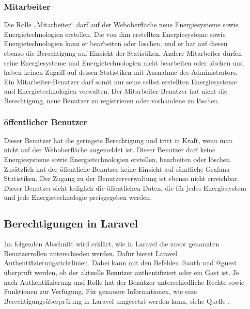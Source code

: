 \subsubsection{Mitarbeiter}
Die Rolle „Mitarbeiter“ darf auf der Weboberfläche neue Energiesysteme sowie Energietechnologien erstellen. Die von ihm erstellten Energiesysteme sowie Energietechnologien kann er bearbeiten oder  löschen, und er hat auf diesen ebenso die Berechtigung auf Einsicht der Statistiken. Andere Mitarbeiter dürfen seine Energiesysteme und Energietechnologien nicht bearbeiten oder löschen und haben keinen Zugriff auf dessen Statistiken mit Ausnahme des Administrators. Ein Mitarbeiter-Benutzer darf somit nur seine selbst erstellten Energiesysteme und Energietechnologien verwalten. Der Mitarbeiter-Benutzer hat nicht die Berechtigung, neue Benutzer zu registrieren oder vorhandene zu löschen.

\subsubsection{öffentlicher Benutzer}
Dieser Benutzer hat die geringste Berechtigung und tritt in Kraft, wenn man nicht auf der Weboberfläche angemeldet ist. Dieser Benutzer darf keine Energiesysteme sowie Energietechnologien erstellen, bearbeiten oder löschen. Zusätzlich hat der öffentliche Benutzer keine Einsicht auf sämtliche Grafana-Statistiken. Der Zugang zu der Benutzerverwaltung ist ebenso nicht erreichbar. Dieser Benutzer sieht lediglich die öffentlichen Daten, die für jedes Energiesystem und jede Energietechnologie preisgegeben werden.

\subsection{Berechtigungen in Laravel}
Im folgenden Abschnitt wird erklärt, wie in Laravel die zuvor genannten Benutzerrollen unterschieden werden.
Dafür bietet Laravel Authentifizierungsrichtlinien. Dabei kann mit den Befehlen @auth und @guest überprüft werden, ob der aktuelle Benutzer authentifiziert oder ein Gast ist. Je nach Authentifizierung und Rolle hat der Benutzer unterschiedliche Rechte sowie Funktionen zur Verfügung.
Für genauere Informationen, wie eine Berechtigungsüberprüfung in Laravel umgesetzt werden kann, siehe Quelle \cite{LaravelAuth}.



